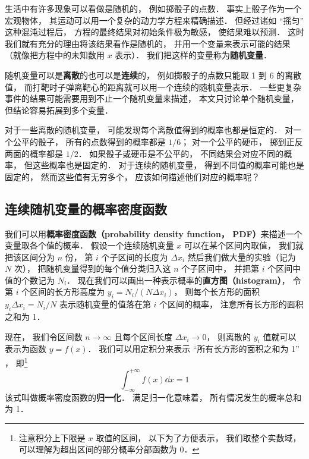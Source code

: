 


生活中有许多现象可以看做是随机的， 例如掷骰子的点数． 事实上骰子作为一个宏观物体， 其运动可以用一个复杂的动力学方程来精确描述． 但经过诸如 “摇匀” 这种混沌过程后， 方程的最终结果对初始条件极为敏感， 使结果难以预测． 这时我们就有充分的理由将该结果看作是随机的， 并用一个变量来表示可能的结果（就像把方程中的未知数用 $x$ 表示）． 我们把这样的变量称为\textbf{随机变量}．

随机变量可以是\textbf{离散}的也可以是\textbf{连续}的， 例如掷骰子的点数只能取 1 到 6 的离散值， 而打靶时子弹离靶心的距离就可以用一个连续的随机变量表示． 一些更复杂事件的结果可能需要用到不止一个随机变量来描述， 本文只讨论单个随机变量， 但结论容易拓展到多个变量．

对于一些离散的随机变量， 可能发现每个离散值得到的概率也都是恒定的． 对一个公平的骰子， 所有的点数得到的概率都是 $1/6$； 对一个公平的硬币， 掷到正反两面的概率都是 $1/2$． 如果骰子或硬币是不公平的， 不同结果会对应不同的概率， 但这些概率也是固定的． 对于连续的随机变量， 得到不同值的概率可能也是固定的， 然而这些值有无穷多个， 应该如何描述他们对应的概率呢？

\subsection{连续随机变量的概率密度函数}
我们可以用\textbf{概率密度函数（probability density function， PDF）}来描述一个变量取各个值的概率． 假设一个连续随机变量 $x$ 可以在某个区间内取值， 我们就把该区间分为 $n$ 份， 第 $i$ 个子区间的长度为 $\Delta x_i$ 然后我们做大量的实验（记为 $N$ 次）， 把随机变量得到的每个值分类归入这 $n$ 个子区间中， 并把第 $i$ 个区间中值的个数记为 $N_i$． 现在我们可以画出一种表示概率的\textbf{直方图（histogram）}， 令第 $i$ 个区间的长方形高度为 $y_i = N_i/(N \Delta x_i)$， 则每个长方形的面积 $y_i \Delta x_i = N_i/N$ 表示随机变量的值落在第 $i$ 个区间的概率， 注意所有长方形的面积之和为 1．


现在， 我们令区间数 $n\to \infty$ 且每个区间长度 $\Delta x_i \to 0$， 则离散的 $y_i$ 值就可以表示为函数 $y = f(x)$． 我们可以用定积分来表示 “所有长方形的面积之和为 1” ， 即\footnote{注意积分上下限是 $x$ 取值的区间， 以下为了方便表示， 我们取整个实数域， 可以理解为超出区间的部分概率分部函数为 0．}
\begin{equation}\label{RandF_eq1}
\int_{-\infty}^{+\infty} f(x)\dd x = 1
\end{equation}
该式叫做概率密度函数的\textbf{归一化}． 满足归一化意味着， 所有情况发生的概率总和为 1．

